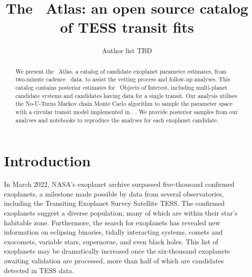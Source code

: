 \documentclass[floatfix,ApJL,twocolumn]{aastex631}
\begin{document}
\title{The \tess\ Atlas: an open source catalog of TESS transit fits}


\author{Author list TBD}
% 





\begin{abstract}
We present the \tess\ Atlas, a catalog of candidate exoplanet parameter estimates, from two-minute cadence \tess\  data, to assist the vetting process and follow-up analyses.
This catalog contains posterior estimates for \red{\numAnalysed} \tess\ Objects of Interest, including \red{\numAnalysedMulti} multi-planet candidate systems and \red{\numAnalysedSingle} candidates having data for a single transit.
Our analysis utilises the No-U-Turns Markov chain Monte Carlo algorithm to sample the parameter space with a circular transit model implemented in \exoplanet.
.
We provide posterior samples from our analyses and \jupyter notebooks to reproduce the analyses for each exoplanet candidate.
\end{abstract}




\section{Introduction} \label{sec:intro}


In March 2022, NASA's exoplanet archive surpassed five-thousand confirmed exoplanets, a milestone made possible by data from several observatories, including the Transiting Exoplanet Survey Satellite TESS.
The confirmed exoplanets suggest a diverse population, many of which are within their star's habitable zone.
Furthermore, the search for exoplanets has revealed new information on eclipsing binaries, tidally interacting systems,  comets and exocomets, variable stars, supernovae, and even black holes.
This list of exoplanets may be dramatically increased once the six-thousand exoplanets awaiting validation are processed, more than half of which are candidates detected in TESS data.
\end{document}
